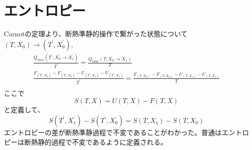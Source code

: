 \documentclass{jsarticle}
\begin{document}
\section{エントロピー}
Carnotの定理より、断熱準静的操作で繋がった状態について$(T, X_0) \rightarrow (T^\prime, X_0^\prime),$
\begin{align}
    \frac{Q_{max}(T^\prime,X_0^\prime \rightarrow X_1^\prime)}{T^\prime} =
    \frac{Q_{max}(T,X_0 \rightarrow X_1)}{T}\\
    \frac{F_(T^\prime,X_0^\prime) - F_(T^\prime,X_0^\prime) - U_(T^\prime,X_1^\prime) - U_(T^\prime,X_1^\prime)}{T^\prime}  =
    \frac{F_(T,X_0) - F_(T,X_0) - U_(T,X_1) - U_(T,X_1)}{T}\\
\end{align}
ここで
\begin{equation}
    S(T, X) = U(T, X) - F(T, X) 
\end{equation}
と定義して、
\begin{equation}
    S(T^\prime, X^\prime_1) - S(T^\prime, X^\prime_0) = S(T, X_1) - S(T, X_0)
\end{equation}
エントロピーの差が断熱準静過程で不変であることがわかった。普通はエントロピーは断熱静的過程で不変であるように定義される。
\end{document}
